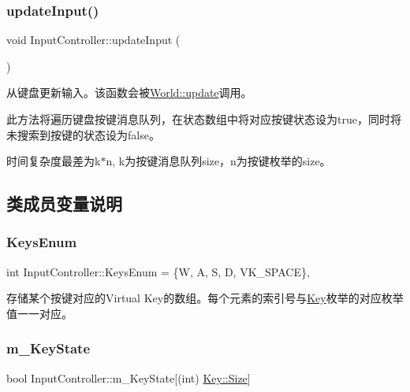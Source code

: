 \subsubsection{\texorpdfstring{update\+Input()}{updateInput()}}
{\footnotesize\ttfamily void Input\+Controller\+::update\+Input (\begin{DoxyParamCaption}{ }\end{DoxyParamCaption})}



从键盘更新输入。该函数会被\hyperlink{class_world_aac8c1fde63c06577ffc648aaefdb37f0}{World\+::update}调用。 

此方法将遍历键盘按键消息队列，在状态数组中将对应按键状态设为true，同时将未搜索到按键的状态设为false。

时间复杂度最差为k$\ast$n, k为按键消息队列size，n为按键枚举的size。 

\subsection{类成员变量说明}
\mbox{\label{class_input_controller_afa9908a71b2107375b9104e51b465b06}} 
\subsubsection{\texorpdfstring{Keys\+Enum}{KeysEnum}}
{\footnotesize\ttfamily int Input\+Controller\+::\+Keys\+Enum = \{\textquotesingle{}W\textquotesingle{}, \textquotesingle{}A\textquotesingle{}, \textquotesingle{}S\textquotesingle{}, \textquotesingle{}D\textquotesingle{}, V\+K\+\_\+\+S\+P\+A\+CE\}\hspace{0.3cm}{\ttfamily [static]}, {\ttfamily [private]}}



存储某个按键对应的\+Virtual Key的数组。每个元素的索引号与\hyperlink{class_input_controller_a840a7425e2220e1ef5659a7ea4ba122d}{Key}枚举的对应枚举值一一对应。 

\mbox{\label{class_input_controller_aebe382d8d20e579a3f2c92b58ad53ac3}} 
\subsubsection{\texorpdfstring{m\+\_\+\+Key\+State}{m\_KeyState}}
{\footnotesize\ttfamily bool Input\+Controller\+::m\+\_\+\+Key\+State\mbox{[}(int) \hyperlink{class_input_controller_a840a7425e2220e1ef5659a7ea4ba122da6f6cb72d544962fa333e2e34ce64f719}{Key\+::\+Size}\mbox{]}\hspace{0.3cm}{\ttfamily [private]}}



